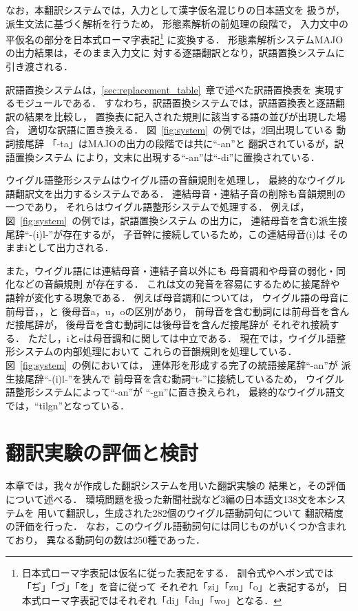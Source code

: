 なお，本翻訳システムでは，入力として漢字仮名混じりの日本語文を
扱うが，派生文法に基づく解析を行うため，
形態素解析の前処理の段階で，
入力文中の平仮名の部分を日本式ローマ字表記\footnote{
日本式ローマ字表記は仮名に従った表記をする．
訓令式やヘボン式では「ぢ」「づ」「を」を音に従って
それぞれ「zi」「zu」「o」と表記するが，
日本式ローマ字表記ではそれぞれ「di」「du」「wo」となる．
}
に変換する．
形態素解析システムMAJOの出力結果は，そのまま入力文に
対する逐語翻訳となり，訳語置換システムに引き渡される．

訳語置換システムは，\ref{sec:replacement_table}~章で述べた訳語置換表を
実現するモジュールである．
すなわち，訳語置換システムでは，訳語置換表と逐語翻訳の結果を比較し，
置換表に記入された規則に該当する語の並びが出現した場合，
適切な訳語に置き換える．
図~\ref{fig:system}~の例では，2回出現している
動詞接尾辞\linebreak
「-ta」はMAJOの出力の段階では共に``-\mg an''と
翻訳されているが，訳語置換システム
により，文末に出現する``-\mg an''は``-di''に置換されている．

ウイグル語整形システムはウイグル語の音韻規則を処理し，
最終的なウイグル語翻訳文を出力するシステムである．
連結母音・連結子音の削除も音韻規則の一つであり，
それらはウイグル語整形システムで処理する．
例えば，図~\ref{fig:system}~の例では，訳語置換システム
の出力に，
連結母音を含む派生接尾辞``-(i)l-''が存在するが，
子音幹に接続しているため，この連結母音(i)は
そのままiとして出力される．

また，ウイグル語には連結母音・連結子音以外にも
母音調和や母音の弱化・同化などの音韻規則
が存在する\cite{TAKEUTI}．
これは文の発音を容易にするために接尾辞や
語幹が変化する現象である．
例えば母音調和については，
ウイグル語の母音に前母音\me ，\mv ，\mo と
後母音a，u，oの区別があり，
前母音を含む動詞には前母音を含んだ接尾辞が，
後母音を含む動詞には後母音を含んだ接尾辞が
それぞれ接続する．
ただし，iとeは母音調和に関しては中立である．
現在では，ウイグル語整形システムの内部処理において
これらの音韻規則を処理している．
図~\ref{fig:system}~の例においては，
連体形を形成する完了の統語接尾辞``-\mg an''が
派生接尾辞``-(i)l-''を狭んで
前母音を含む動詞``\me t-''に接続しているため，
ウイグル語整形システムによって``-\mg an''が
``-g\me n''に置き換えられ，
最終的なウイグル語文では，``\me tilg\me n''となっている．

\section{翻訳実験の評価と検討}
本章では，我々が作成した翻訳システムを用いた翻訳実験の
結果と，その評価について述べる．
環境問題を扱った新聞社説など3編の日本語文138文を本システムを
用いて翻訳し，生成された282個のウイグル語動詞句について
翻訳精度の評価を行った．
なお，このウイグル語動詞句には同じものがいくつか含まれており，
異なる動詞句の数は250種であった．

